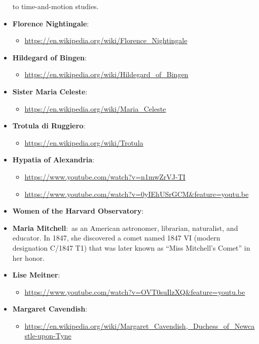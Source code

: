 \documentclass[11pt,a4paper]{article}
\begin{document}
\begin{itemize}
    to time-and-motion studies.
    \item \textbf{Florence Nightingale}:\ 
    \begin{itemize}
      \item[] \url{https://en.wikipedia.org/wiki/Florence_Nightingale} 
    \end{itemize}
    \item \textbf{Hildegard of Bingen}:\
    \begin{itemize}
      \item[] \url{https://en.wikipedia.org/wiki/Hildegard_of_Bingen}
    \end{itemize}
    \item \textbf{Sister Maria Celeste}:\
    \begin{itemize}
      \item[] \url{https://en.wikipedia.org/wiki/Maria_Celeste} 
    \end{itemize}
    \item \textbf{Trotula di Ruggiero}:\ 
    \begin{itemize}
      \item[] \url{https://en.wikipedia.org/wiki/Trotula} 
    \end{itemize}
    \item \textbf{Hypatia of Alexandria}:\ 
    \begin{itemize}
      \item[] \url{https://www.youtube.com/watch?v=n1mwZrVJ-TI}
      \item[] \url{https://www.youtube.com/watch?v=0yIEhUSrGCM&feature=youtu.be}
    \end{itemize}
    \item \textbf{Women of the Harvard Observatory}:\
    \item \textbf{Maria Mitchell}:\ as an American astronomer, librarian, naturalist, and educator. In 1847, she discovered a comet named 1847 VI (modern designation C/1847 T1) 
    that was later known as ``Miss Mitchell’s Comet'' in her honor.
    \item \textbf{Lise Meitner}:\
    \begin{itemize}
      \item [] \url{https://www.youtube.com/watch?v=OVT0suIlzXQ&feature=youtu.be}
    \end{itemize}
    \item \textbf{Margaret Cavendish}:\ 
    \begin{itemize}
      \item[] \url{https://en.wikipedia.org/wiki/Margaret_Cavendish,_Duchess_of_Newcastle-upon-Tyne}

\end{itemize}
\end{itemize}
\end{document}
